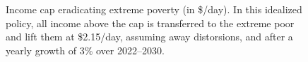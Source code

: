 \begin{figure}[h]
  \caption[Anti-extreme-poverty cap in 2030 after 3\% growth.]{Income cap eradicating extreme poverty (in \$/day). In this idealized policy, all income above the cap is transferred to the extreme poor and lift them at \$2.15/day, assuming away distorsions, and after a yearly growth of 3\% over 2022--2030. %
  }\label{fig:antipoverty_cap}
\end{figure} 

